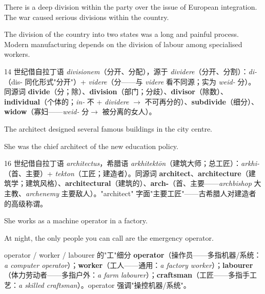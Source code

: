 \documentclass[../main.tex]{subfiles}
\begin{document}

{There is a deep division within the party over the issue of European integration.}
{The war caused serious divisions within the country.}

{The division of the country into two states was a long and painful process.}
{Modern manufacturing depends on the division of labour among specialised workers.}

\begin{origin}
14 世纪借自拉丁语 \textit{divisionem}（分开、分配），源于 \textit{dividere}（分开、分割）：\textit{di-}（dis- 同化形式"分开"）+ \textit{videre}（分——与 \textit{videre} 看不同源；实为 \textit{weid-} 分）。同源词 \textbf{divide}（分；除）、\textbf{division}（部门；分歧）、\textbf{divisor}（除数）、\textbf{individual}（个体的；\textit{in-} 不 + \textit{dividere} $\to$ 不可再分的）、\textbf{subdivide}（细分）、\textbf{widow}（寡妇——\textit{weid-} 分$\to$ 被分离的女人）。
\end{origin}


{The architect designed several famous buildings in the city centre.}

{She was the chief architect of the new education policy.}

\begin{origin}
16 世纪借自拉丁语 \textit{architectus}，希腊语 \textit{arkhitektōn}（建筑大师；总工匠）：\textit{arkhi-}（首、主要）+ \textit{tekton}（工匠；建造者）。同源词 \textbf{architect}、\textbf{architecture}（建筑学；建筑风格）、\textbf{architectural}（建筑的）、\textbf{arch-}（首、主要——\textit{archbishop} 大主教、\textit{archenemy} 主要敌人）。"architect" 字面"主要工匠"——古希腊人对建造者的高级称谓。
\end{origin}


{She works as a machine operator in a factory.}

{At night, the only people you can call are the emergency operator.}

\begin{gram}{operator / worker / labourer 的"工"细分}
\textbf{operator}（操作员——多指机器/系统：\textit{a computer operator}）；\textbf{worker}（工人——通用：\textit{a factory worker}）；\textbf{labourer}（体力劳动者——多指户外：\textit{a farm labourer}）；\textbf{craftsman}（工匠——多指手工艺：\textit{a skilled craftsman}）。operator 强调"操控机器/系统"。
\end{gram}
\end{document}
